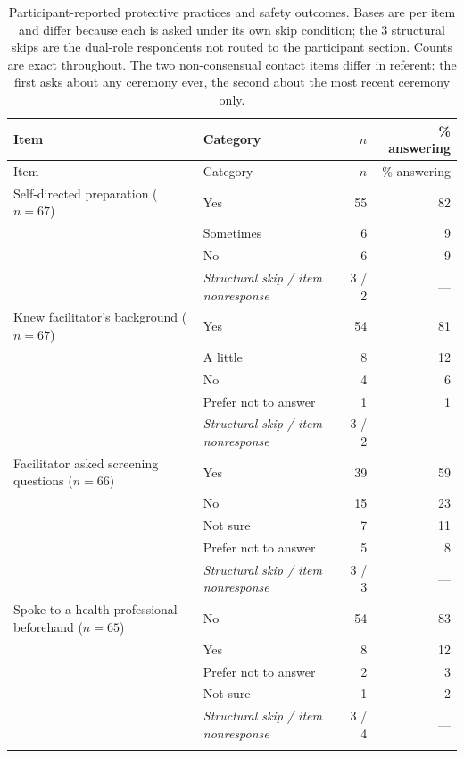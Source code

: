 \documentclass[12pt]{article}
\begin{document}
\begin{longtable}{p{5.2cm}p{4.8cm}rr}
\caption{Participant-reported protective practices and safety outcomes. Bases are per item and differ
because each is asked under its own skip condition; the 3 structural skips are the dual-role respondents
not routed to the participant section. Counts are exact throughout. The two non-consensual contact items
differ in referent: the first asks about any ceremony ever, the second about the most recent ceremony only.}
\label{tab:safety} \\
\toprule
Item & Category & $n$ & \% answering \\
\midrule
\endfirsthead
\toprule
Item & Category & $n$ & \% answering \\
\midrule
\endhead
Self-directed preparation ($n=67$) & Yes & 55 & 82 \\
                & Sometimes & 6 & 9 \\
                & No & 6 & 9 \\
                & \emph{Structural skip / item nonresponse} & 3 / 2 & --- \\
\addlinespace
Knew facilitator's background ($n=67$) & Yes & 54 & 81 \\
                & A little & 8 & 12 \\
                & No & 4 & 6 \\
                & Prefer not to answer & 1 & 1 \\
                & \emph{Structural skip / item nonresponse} & 3 / 2 & --- \\
\addlinespace
Facilitator asked screening questions ($n=66$) & Yes & 39 & 59 \\
                & No & 15 & 23 \\
                & Not sure & 7 & 11 \\
                & Prefer not to answer & 5 & 8 \\
                & \emph{Structural skip / item nonresponse} & 3 / 3 & --- \\
\addlinespace
Spoke to a health professional beforehand ($n=65$) & No & 54 & 83 \\
                & Yes & 8 & 12 \\
                & Prefer not to answer & 2 & 3 \\
                & Not sure & 1 & 2 \\
                & \emph{Structural skip / item nonresponse} & 3 / 4 & --- \\
\addlinespace

\end{longtable}
\end{document}

